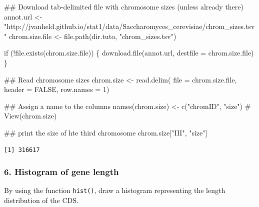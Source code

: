 \documentclass[]{article}
\newenvironment{Shaded}{\begin{snugshade}}{\end{snugshade}}
\newcommand{\KeywordTok}[1]{\textcolor[rgb]{0.94,0.87,0.69}{#1}}
\newcommand{\DataTypeTok}[1]{\textcolor[rgb]{0.87,0.87,0.75}{#1}}
\newcommand{\DecValTok}[1]{\textcolor[rgb]{0.86,0.86,0.80}{#1}}
\newcommand{\StringTok}[1]{\textcolor[rgb]{0.80,0.58,0.58}{#1}}
\newcommand{\CommentTok}[1]{\textcolor[rgb]{0.50,0.62,0.50}{#1}}
\newcommand{\OtherTok}[1]{\textcolor[rgb]{0.94,0.94,0.56}{#1}}
\newcommand{\ControlFlowTok}[1]{\textcolor[rgb]{0.94,0.87,0.69}{#1}}
\newcommand{\OperatorTok}[1]{\textcolor[rgb]{0.94,0.94,0.82}{#1}}
\newcommand{\NormalTok}[1]{\textcolor[rgb]{0.80,0.80,0.80}{#1}}
\begin{document}
\begin{Shaded}
\begin{Highlighting}[]
\NormalTok{## Download tab-delimited file with chromosome sizes (unless already there)}
\NormalTok{annot.url <-}\StringTok{ "http://jvanheld.github.io/stat1/data/Saccharomyces_cerevisiae/chrom_sizes.tsv"}
\NormalTok{chrom.size.file <-}\StringTok{ }\KeywordTok{file.path}\NormalTok{(dir.tuto, }\StringTok{"chrom_sizes.tsv"}\NormalTok{)}

\ControlFlowTok{if}\NormalTok{ (}\OperatorTok{!}\KeywordTok{file.exists}\NormalTok{(chrom.size.file)) \{}
    \KeywordTok{download.file}\NormalTok{(annot.url, }\DataTypeTok{destfile =}\NormalTok{ chrom.size.file)}
\NormalTok{\}}

\NormalTok{## Read chromosome sizes}
\NormalTok{chrom.size <-}\StringTok{ }\KeywordTok{read.delim}\NormalTok{(}
  \DataTypeTok{file =}\NormalTok{ chrom.size.file,}
  \DataTypeTok{header =} \OtherTok{FALSE}\NormalTok{, }\DataTypeTok{row.names =} \DecValTok{1}\NormalTok{)}

\NormalTok{## Assign a name to the columns}
\KeywordTok{names}\NormalTok{(chrom.size) <-}\StringTok{ }\KeywordTok{c}\NormalTok{(}\StringTok{"chromID"}\NormalTok{, }\StringTok{"size"}\NormalTok{)}
\CommentTok{# View(chrom.size)}

\NormalTok{## print the size of hte third chromosome}
\NormalTok{chrom.size[}\StringTok{"III"}\NormalTok{, }\StringTok{"size"}\NormalTok{]}
\end{Highlighting}
\end{Shaded}

\begin{verbatim}
[1] 316617
\end{verbatim}

\subsubsection{6. Histogram of gene
length}\label{histogram-of-gene-length}

By using the function \texttt{hist()}, draw a histogram representing the
length distribution of the CDS.

\begin{Shaded}
\end{Shaded}
\end{document}
